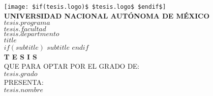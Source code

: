 

\pagestyle{plain} %

\begin{titlepage}
    \begin{center}
        \vspace*{-0.2cm} %
        
        \texttt{[image: \$if(tesis.logo)\$ \$tesis.logo\$ \$endif\$]}\\[0.5cm]
        
        {\large \textbf{UNIVERSIDAD NACIONAL AUTÓNOMA DE MÉXICO}}\\[0.4cm]
        
        {\large \textbf{\MakeUppercase{$tesis.programa$}}}\\[0.3cm]
        
        {\large \MakeUppercase{$tesis.facultad$}}\\[0.2cm]
        {\large \MakeUppercase{$tesis.departmento$}}\\[0.3cm]
        
        {\Large \textbf{$title$}}\\[0.2cm]
        {\small $if(subtitle)$ $subtitle$ $endif$}\\[0.2cm]
        
        {\LARGE \textbf{T E S I S}}\\[0.5cm]
        
        {\large QUE PARA OPTAR POR EL GRADO DE:}\\[0.15cm]
        {\Large \textbf{$tesis.grado$}}\\[0.4cm]
        
        {\large PRESENTA:}\\[0.1cm]
        {\LARGE \textbf{$tesis.nombre$}}\\[0.4cm]
        

\end{center}
\end{titlepage}
